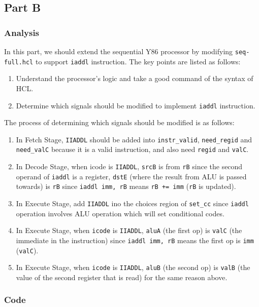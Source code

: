 \documentclass{article}
\begin{document}
\subsection{Part B}

\subsubsection{Analysis}

In this part, we should extend the sequential Y86 processor by modifying \verb|seq-full.hcl| to support \verb|iaddl| instruction. The key points are listed as follows:

\begin{enumerate}
  \item Understand the processor's logic and take a good command of the syntax of HCL.
  \item Determine which signals should be modified to implement \verb|iaddl| instruction.
\end{enumerate}

\noindent The process of determining which signals should be modified is as follows:

\begin{enumerate}
  \item In Fetch Stage, \verb|IIADDL| should be added into \verb|instr_valid|, \verb|need_regid| and \verb|need_valC| because it is a valid instruction, and also need \verb|regid| and \verb|valC|.
  \item In Decode Stage, when icode is \verb|IIADDL|, \verb|srcB| is from \verb|rB| since the second operand of \verb|iaddl| is a register, \verb|dstE| (where the result from ALU is passed towards) is \verb|rB| since \verb|iaddl imm, rB| means \verb|rB += imm| (\verb|rB| is updated).
  \item In Execute Stage, add \verb|IIADDL| ino the choices region of \verb|set_cc| since \verb|iaddl| operation involves ALU operation which will set conditional codes.
  \item In Execute Stage, when \verb|icode| is \verb|IIADDL|, \verb|aluA| (the first op) is \verb|valC| (the immediate in the instruction) since \verb|iaddl imm, rB| means the first op is \verb|imm| (\verb|valC|).
  \item In Execute Stage, when \verb|icode| is \verb|IIADDL|, \verb|aluB| (the second op) is \verb|valB| (the value of the second register that is read) for the same reason above.
\end{enumerate}

\subsubsection{Code}
\end{document}
